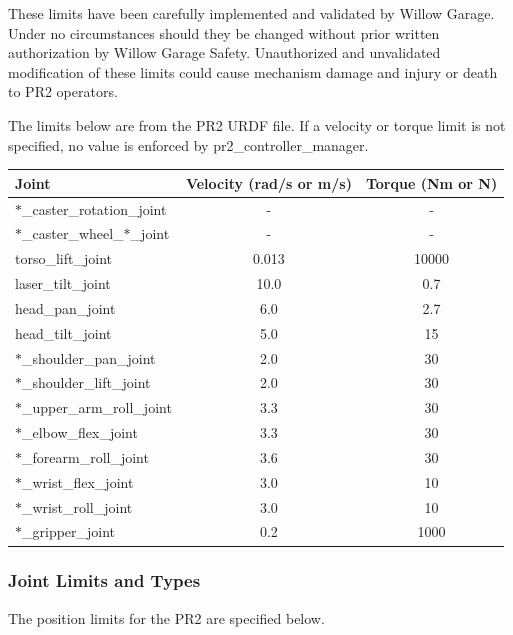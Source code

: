 These limits have been carefully implemented and validated by Willow Garage. Under no circumstances should they be changed without prior written authorization by Willow Garage Safety. Unauthorized and unvalidated modification of these limits could cause mechanism damage and injury or death to PR2 operators. 

The limits below are from the PR2 URDF file. If a velocity or torque limit is not specified, no value is enforced by pr2\_controller\_manager.

\begin{tabular}{l*{2}{c}}
Joint  & Velocity (rad/s or m/s) & Torque (Nm or N) \\
\hline \hline
$\ast$\_caster\_rotation\_joint        & -     & - \\
$\ast$\_caster\_wheel\_$\ast$\_joint   & -     & - \\
torso\_lift\_joint                     & 0.013 & 10000 \\
laser\_tilt\_joint                     & 10.0  & 0.7 \\
head\_pan\_joint                       & 6.0   & 2.7  \\
head\_tilt\_joint                      & 5.0   & 15  \\
$\ast$\_shoulder\_pan\_joint           & 2.0   & 30  \\
$\ast$\_shoulder\_lift\_joint          & 2.0   & 30  \\
$\ast$\_upper\_arm\_roll\_joint        & 3.3   & 30  \\
$\ast$\_elbow\_flex\_joint             & 3.3   & 30  \\
$\ast$\_forearm\_roll\_joint           & 3.6   & 30 \\
$\ast$\_wrist\_flex\_joint             & 3.0   & 10  \\
$\ast$\_wrist\_roll\_joint             & 3.0   & 10 \\
$\ast$\_gripper\_joint                 & 0.2   & 1000 \\
\end{tabular}

\subsubsection{Joint Limits and Types}

The position limits for the PR2 are specified below. 

